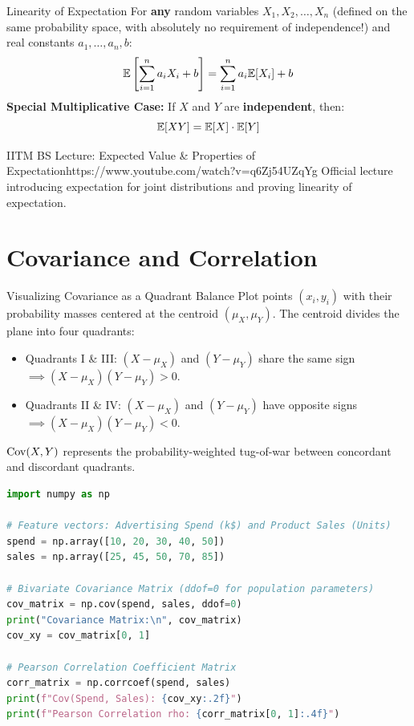 \begin{theorembox}{Linearity of Expectation}
For \textbf{any} random variables $X_1, X_2, \dots, X_n$ (defined on the same probability space, with absolutely no requirement of independence!) and real constants $a_1, \dots, a_n, b$:
$$\mathbb{E}\left[ \sum_{i=1}^n a_i X_i + b \right] = \sum_{i=1}^n a_i \mathbb{E}[X_i] + b$$
\textbf{Special Multiplicative Case:} If $X$ and $Y$ are \textbf{independent}, then:
$$\mathbb{E}[X Y] = \mathbb{E}[X] \cdot \mathbb{E}[Y]$$
\end{theorembox}

\begin{videocard}{IITM BS Lecture: Expected Value \& Properties of Expectation}{https://www.youtube.com/watch?v=q6Zj54UZqYg}
Official lecture introducing expectation for joint distributions and proving linearity of expectation.
\end{videocard}

\section{Covariance and Correlation}

\begin{intuitionbox}{Visualizing Covariance as a Quadrant Balance}
Plot points $(x_i, y_i)$ with their probability masses centered at the centroid $(\mu_X, \mu_Y)$. The centroid divides the plane into four quadrants:
\begin{itemize}
    \item Quadrants I \& III: $(X - \mu_X)$ and $(Y - \mu_Y)$ share the same sign $\implies (X - \mu_X)(Y - \mu_Y) > 0$.
    \item Quadrants II \& IV: $(X - \mu_X)$ and $(Y - \mu_Y)$ have opposite signs $\implies (X - \mu_X)(Y - \mu_Y) < 0$.
\end{itemize}
$\operatorname{Cov}(X, Y)$ represents the probability-weighted tug-of-war between concordant and discordant quadrants.
\end{intuitionbox}

\begin{lstlisting}[language=Python, caption=Data Science: Covariance and Correlation Matrices in NumPy]
import numpy as np

# Feature vectors: Advertising Spend (k$) and Product Sales (Units)
spend = np.array([10, 20, 30, 40, 50])
sales = np.array([25, 45, 50, 70, 85])

# Bivariate Covariance Matrix (ddof=0 for population parameters)
cov_matrix = np.cov(spend, sales, ddof=0)
print("Covariance Matrix:\n", cov_matrix)
cov_xy = cov_matrix[0, 1]

# Pearson Correlation Coefficient Matrix
corr_matrix = np.corrcoef(spend, sales)
print(f"Cov(Spend, Sales): {cov_xy:.2f}")
print(f"Pearson Correlation rho: {corr_matrix[0, 1]:.4f}")
\end{lstlisting}

